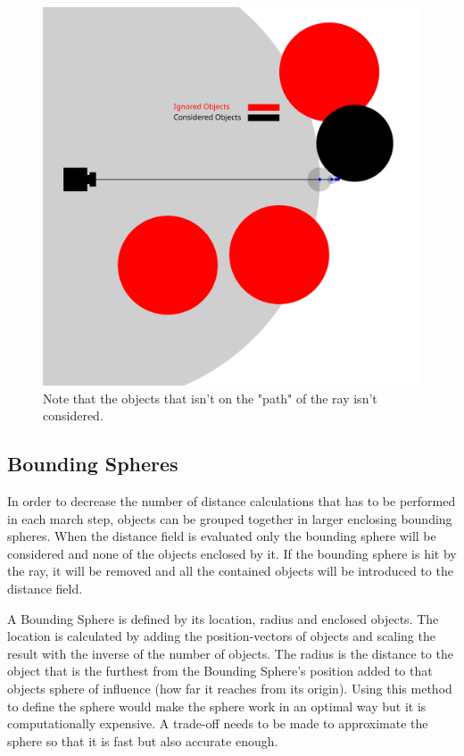 			\begin{figure}[H]
				\centering
				\includegraphics[width=1.0\linewidth]{figure/WithCulling} 
				\caption{Note that the objects that isn't on the "path" of the ray
				isn't considered.}
			\end{figure}

		\subsection{Bounding Spheres}
			
			In order to decrease the number of distance calculations that has 
			to be performed in each march step, objects can be grouped together 
			in larger enclosing bounding spheres. When the distance field is 
			evaluated only the bounding sphere will be considered and none of 
			the objects enclosed by	it. If the bounding sphere is hit by the 
			ray, it will be removed and all	the contained objects will be 
			introduced to the distance field.
			
			A Bounding Sphere is defined by its location, radius and enclosed
			objects. The location is calculated by adding the position-vectors
			of objects and scaling the result with the inverse of the number of
			objects. The radius is the distance to the object that is the
			furthest from the Bounding Sphere's position added to that objects
			sphere of influence (how far it reaches from its origin). Using 
			this method to define the sphere would make the sphere work in an 
			optimal way but it is computationally expensive. A trade-off needs 
			to be made to approximate the sphere so that it is fast but also 
			accurate enough.

